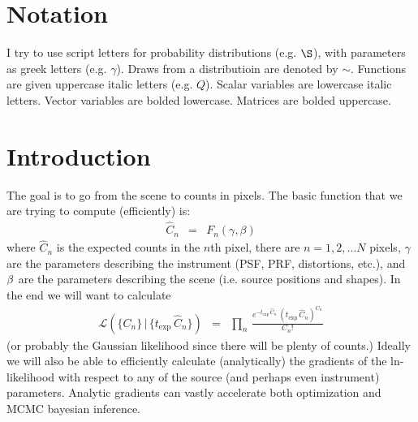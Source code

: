 \documentclass[modern]{aastex6}
\newcommand{\given}{\,|\,}
\newcommand{\counts}{C}
\newcommand{\countrate}{\hat{C}}
\newcommand{\exptime}{t_{\mathrm{exp}}}
\newcommand{\qe}{Q}
\newcommand{\like}{\mathcal{L}}
\begin{document}
\author{Image Forward Modeling Techniques}


\section{Notation}
I try to use script letters for probability distributions (e.g. $\S$), with parameters as greek letters (e.g. $\gamma$).
Draws from a distributioin are denoted by $\sim$.
Functions are given uppercase italic letters (e.g. $\qe$).
Scalar variables are lowercase italic letters.
Vector variables are bolded lowercase.
Matrices are bolded uppercase.

\section{Introduction}
The goal is to go from the scene to counts in pixels.
The basic function that we are trying to compute (efficiently) is:
\begin{eqnarray}
\countrate_n & = & F_n(\gamma, \beta)
\end{eqnarray}
where $\countrate_n$ is the expected counts in the $n$th pixel,
there are $n=1,2,...N$ pixels,
$\gamma$ are the parameters describing the instrument (PSF, PRF, distortions, etc.),
and ${\bf \beta}$ are the parameters describing the scene (i.e. source positions and shapes).
In the end we will want to calculate
\begin{eqnarray}
\like(\{\counts_n\} \given \{\exptime \, \countrate_n\}) & = & \prod_n \, \frac{e^{-\exptime \, \countrate_n} \, (\exptime \, \countrate_n)^{\counts_n}} {\counts_n !}
\end{eqnarray}
(or probably the Gaussian likelihood since there will be plenty of counts.)
Ideally we will also be able to efficiently calculate (analytically) the gradients of the ln-likelihood with respect to any of the source (and perhaps even instrument) parameters.
Analytic gradients can vastly accelerate both optimization and MCMC bayesian inference.
\end{document}
